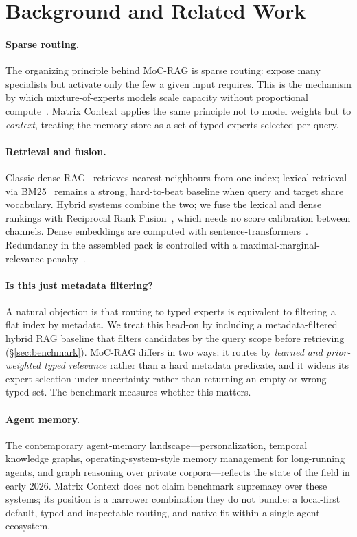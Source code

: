 \section{Background and Related Work}

\paragraph{Sparse routing.} The organizing principle behind MoC-RAG is sparse
routing: expose many specialists but activate only the few a given input
requires. This is the mechanism by which mixture-of-experts models scale
capacity without proportional compute~\cite{shazeer2017moe}. Matrix Context
applies the same principle not to model weights but to \emph{context}, treating
the memory store as a set of typed experts selected per query.

\paragraph{Retrieval and fusion.} Classic dense RAG~\cite{lewis2020rag} retrieves
nearest neighbours from one index; lexical retrieval via BM25~\cite{robertson2009bm25}
remains a strong, hard-to-beat baseline when query and target share vocabulary.
Hybrid systems combine the two; we fuse the lexical and dense rankings with
Reciprocal Rank Fusion~\cite{cormack2009rrf}, which needs no score calibration
between channels. Dense embeddings are computed with
sentence-transformers~\cite{reimers2019sbert}. Redundancy in the assembled pack
is controlled with a maximal-marginal-relevance penalty~\cite{carbonell1998mmr}.

\paragraph{Is this just metadata filtering?} A natural objection is that routing
to typed experts is equivalent to filtering a flat index by metadata. We treat
this head-on by including a metadata-filtered hybrid RAG baseline that filters
candidates by the query scope before retrieving (\S\ref{sec:benchmark}). MoC-RAG
differs in two ways: it routes by \emph{learned and prior-weighted typed
relevance} rather than a hard metadata predicate, and it widens its expert
selection under uncertainty rather than returning an empty or wrong-typed set.
The benchmark measures whether this matters.

\paragraph{Agent memory.} The contemporary agent-memory landscape---personalization,
temporal knowledge graphs, operating-system-style memory management for
long-running agents, and graph reasoning over private corpora---reflects the
state of the field in early 2026. Matrix Context does not claim benchmark
supremacy over these systems; its position is a narrower combination they do not
bundle: a local-first default, typed and inspectable routing, and native fit
within a single agent ecosystem.
